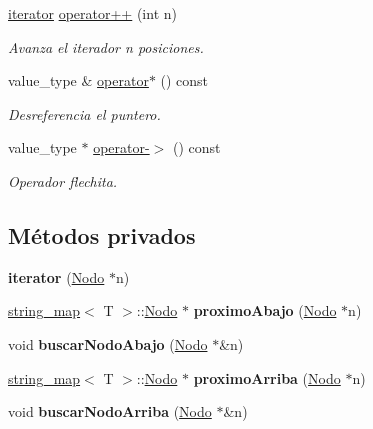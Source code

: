 \begin{DoxyCompactItemize}
\mbox{\hyperlink{classstring__map_1_1iterator}{iterator}} \mbox{\hyperlink{classstring__map_1_1iterator_a8b5800a8088641deb59733b264741456}{operator++}} (int n)
\begin{DoxyCompactList}\small\item\em Avanza el iterador n posiciones. \end{DoxyCompactList}\item 
value\+\_\+type \& \mbox{\hyperlink{classstring__map_1_1iterator_a038260842d444e91f54e58ce7b0c8bcb}{operator$\ast$}} () const
\begin{DoxyCompactList}\small\item\em Desreferencia el puntero. \end{DoxyCompactList}\item 
value\+\_\+type $\ast$ \mbox{\hyperlink{classstring__map_1_1iterator_a45053b6d360c1a5fd5918dc91604c38f}{operator-\/$>$}} () const
\begin{DoxyCompactList}\small\item\em Operador flechita. \end{DoxyCompactList}\end{DoxyCompactItemize}
\subsection*{Métodos privados}
\begin{DoxyCompactItemize}
\item 
\mbox{\label{classstring__map_1_1iterator_a9adc687055baa860aaddb8f2f955ae1a}} 
{\bfseries iterator} (\mbox{\hyperlink{structstring__map_1_1Nodo}{Nodo}} $\ast$n)
\item 
\mbox{\label{classstring__map_1_1iterator_a6cc896811a026a8ef41b18e752d7242e}} 
\mbox{\hyperlink{classstring__map}{string\+\_\+map}}$<$ T $>$\+::\mbox{\hyperlink{structstring__map_1_1Nodo}{Nodo}} $\ast$ {\bfseries proximo\+Abajo} (\mbox{\hyperlink{structstring__map_1_1Nodo}{Nodo}} $\ast$n)
\item 
\mbox{\label{classstring__map_1_1iterator_a00b59cd4a85c0828dea0aade6f532e73}} 
void {\bfseries buscar\+Nodo\+Abajo} (\mbox{\hyperlink{structstring__map_1_1Nodo}{Nodo}} $\ast$\&n)
\item 
\mbox{\label{classstring__map_1_1iterator_a48327eb643b98cf47f1fc5b4ee0cc4b5}} 
\mbox{\hyperlink{classstring__map}{string\+\_\+map}}$<$ T $>$\+::\mbox{\hyperlink{structstring__map_1_1Nodo}{Nodo}} $\ast$ {\bfseries proximo\+Arriba} (\mbox{\hyperlink{structstring__map_1_1Nodo}{Nodo}} $\ast$n)
\item 
\mbox{\label{classstring__map_1_1iterator_a51444dff4d88dfd7750691f7fc9da4d9}} 
void {\bfseries buscar\+Nodo\+Arriba} (\mbox{\hyperlink{structstring__map_1_1Nodo}{Nodo}} $\ast$\&n)
\end{DoxyCompactItemize}

